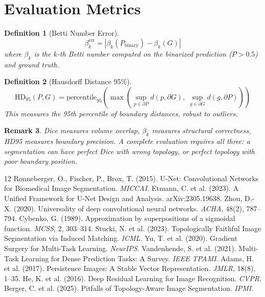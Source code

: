 \documentclass[10pt,twocolumn]{article}
\newtheorem{definition}{Definition}[section]
\newtheorem{remark}[definition]{Remark}
\begin{document}
\section{Evaluation Metrics}

\begin{definition}[Betti Number Error]
\begin{equation}
\beta_k^{\text{err}} = |\beta_k(P_{\text{binary}}) - \beta_k(G)|
\end{equation}
where $\beta_k$ is the $k$-th Betti number computed on the binarized prediction ($P > 0.5$) and ground truth.
\end{definition}

\begin{definition}[Hausdorff Distance 95\%]
\begin{equation}
\text{HD}_{95}(P, G) = \text{percentile}_{95}\left(\max\left(\sup_{p \in \partial P} d(p, \partial G),\; \sup_{g \in \partial G} d(g, \partial P)\right)\right)
\end{equation}
This measures the 95th percentile of boundary distances, robust to outliers.
\end{definition}

\begin{remark}
Dice measures \emph{volume overlap}, $\beta_k$ measures \emph{structural correctness}, HD95 measures \emph{boundary precision}. A complete evaluation requires all three: a segmentation can have perfect Dice with wrong topology, or perfect topology with poor boundary position.
\end{remark}

\begin{thebibliography}{12}
 Ronneberger, O., Fischer, P., Brox, T. (2015). U-Net: Convolutional Networks for Biomedical Image Segmentation. \emph{MICCAI}.
 Etmann, C. et al. (2023). A Unified Framework for U-Net Design and Analysis. arXiv:2305.19638.
 Zhou, D.-X. (2020). Universality of deep convolutional neural networks. \emph{ACHA}, 48(2), 787--794.
 Cybenko, G. (1989). Approximation by superpositions of a sigmoidal function. \emph{MCSS}, 2, 303--314.
 Stucki, N. et al. (2023). Topologically Faithful Image Segmentation via Induced Matching. \emph{ICML}.
 Yu, T. et al. (2020). Gradient Surgery for Multi-Task Learning. \emph{NeurIPS}.
 Vandenhende, S. et al. (2021). Multi-Task Learning for Dense Prediction Tasks: A Survey. \emph{IEEE TPAMI}.
 Adams, H. et al. (2017). Persistence Images: A Stable Vector Representation. \emph{JMLR}, 18(8), 1--35.
 He, K. et al. (2016). Deep Residual Learning for Image Recognition. \emph{CVPR}.
 Berger, C. et al. (2025). Pitfalls of Topology-Aware Image Segmentation. \emph{IPMI}.
\end{thebibliography}
\end{document}
